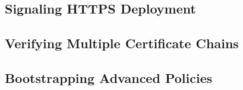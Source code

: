 


\subsection{Signaling HTTPS Deployment}
\label{sec:design:signaling}

\subsection{Verifying Multiple Certificate Chains}
\label{sec:design:verifying}

\subsection{Bootstrapping Advanced Policies}
\label{sec:design:bootstrapping}


